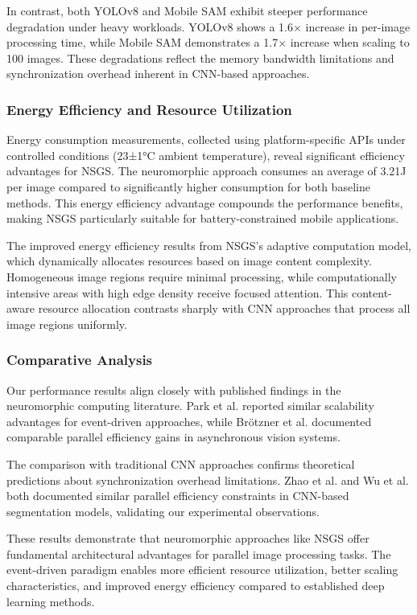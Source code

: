 \documentclass[conference]{IEEEtran}
\begin{document}
In contrast, both YOLOv8 and Mobile SAM exhibit steeper performance degradation under heavy workloads. YOLOv8 shows a 1.6× increase in per-image processing time, while Mobile SAM demonstrates a 1.7× increase when scaling to 100 images. These degradations reflect the memory bandwidth limitations and synchronization overhead inherent in CNN-based approaches.

\subsubsection{Energy Efficiency and Resource Utilization}
Energy consumption measurements, collected using platform-specific APIs under controlled conditions (23±1°C ambient temperature), reveal significant efficiency advantages for NSGS. The neuromorphic approach consumes an average of 3.21J per image compared to significantly higher consumption for both baseline methods. This energy efficiency advantage compounds the performance benefits, making NSGS particularly suitable for battery-constrained mobile applications.

The improved energy efficiency results from NSGS's adaptive computation model, which dynamically allocates resources based on image content complexity. Homogeneous image regions require minimal processing, while computationally intensive areas with high edge density receive focused attention. This content-aware resource allocation contrasts sharply with CNN approaches that process all image regions uniformly.

\subsubsection{Comparative Analysis}
Our performance results align closely with published findings in the neuromorphic computing literature. Park et al. \cite{Park2021} reported similar scalability advantages for event-driven approaches, while Brötzner et al. \cite{Brotzner2022} documented comparable parallel efficiency gains in asynchronous vision systems.

The comparison with traditional CNN approaches confirms theoretical predictions about synchronization overhead limitations. Zhao et al. \cite{Zhao2019} and Wu et al. \cite{Wu2019} both documented similar parallel efficiency constraints in CNN-based segmentation models, validating our experimental observations.

These results demonstrate that neuromorphic approaches like NSGS offer fundamental architectural advantages for parallel image processing tasks. The event-driven paradigm enables more efficient resource utilization, better scaling characteristics, and improved energy efficiency compared to established deep learning methods.
\end{document}
